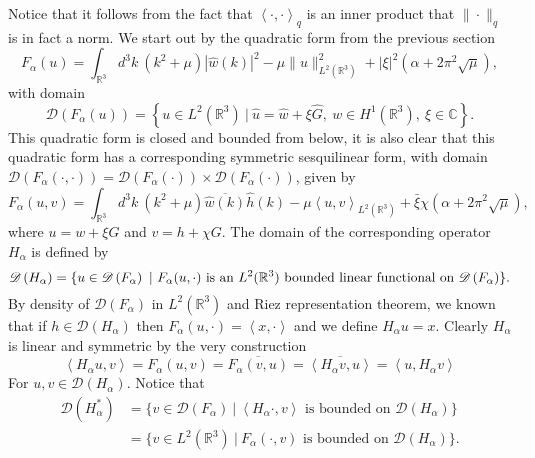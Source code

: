 \documentclass[a4paper,11pt]{article}
\newcommand{\dom}[1]{\mathscr D\left(#1\right)}
\renewcommand{\braket}[1]{\left\langle#1\right\rangle}
\newcommand{\R}{\mathbb{R}}
\newcommand{\C}{\mathbb{C}}
\numberwithin{equation}{section}
\begin{document}
Notice that it follows from the fact that $ \braket{\cdot,\cdot}_q $ is an inner product that $ \|\cdot\|_q $ is in fact a norm.
We start out by the quadratic form from the previous section
\begin{equation}
F_\alpha(u)=\int_{\R^3} d^3k\ \left(k^2+\mu\right)|\hat{w}(k)|^2-\mu\|u\|^2_{L^2(\R^3)}+|\xi|^2\left(\alpha+2\pi^2\sqrt{\mu}\right),
\end{equation}
with domain\begin{equation}
\dom{F_\alpha(u)}=\left\{u\in L^2(\R^3) \ |\ \hat{u}=\hat{w}+\xi\hat{G},\ w\in H^1(\R^3),\ \xi\in\C \right\}.
\end{equation}
This quadratic form is closed and bounded from below, it is also clear that this quadratic form has a corresponding symmetric sesquilinear form, with domain\\ $ \dom{F_\alpha(\cdot,\cdot)}=\dom{F_\alpha(\cdot)}\times\dom{F_\alpha(\cdot
	)} $, given by\begin{equation}
F_\alpha(u,v)=\int_{\R^3} d^3k\ \left(k^2+\mu\right)\overline{\hat{w}(k)}\hat{h}(k)-\mu\braket{u,v}_{L^2(\R^3)}+\bar{\xi}\chi\left(\alpha+2\pi^2\sqrt{\mu}\right),
\end{equation}
where $ u=w+\xi G $ and $ v=h+\chi G $. The domain of the corresponding operator $ H_\alpha $ is defined by \begin{equation}
\dom{H_\alpha}=\{u\in \dom{F_\alpha}\ |\ F_\alpha(u,\cdot) \text{ is an $ L^2(\R^3) $ bounded linear functional on }\dom{F_\alpha} \}.
\end{equation}
By density of $ \dom{F_\alpha} $ in $ L^2(\R^3) $ and Riez representation theorem, we known that if $ h\in\dom{H_\alpha} $ then $ F_\alpha(u,\cdot)=\braket{x,\cdot} $ and we define $ H_\alpha u=x $. Clearly $ H_\alpha $ is linear and symmetric by the very construction\begin{equation}
\braket{H_\alpha u,v}=F_\alpha(u,v)=\overline{F_\alpha(v,u)}=\overline{\braket{H_\alpha v, u}}=\braket{u,H_\alpha v}
\end{equation} 
For $ u,v \in\dom{H_\alpha} $. Notice that \begin{equation}
\begin{aligned}
\dom{H_\alpha^*}&=\{v\in \dom{F_\alpha}\ |\ \braket{H_\alpha \cdot, v}\text{ is bounded on } \dom{H_\alpha} \}\\&=\{v\in L^2(\R^3)\ |\ F_\alpha(\cdot,v) \text{ is bounded on } \dom{H_\alpha} \}.
\end{aligned}
\end{equation}
\end{document}
